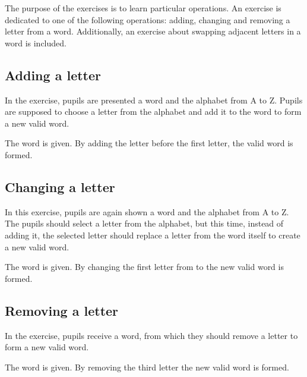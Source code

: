 The purpose of the  exercises is to learn particular operations. An exercise is dedicated to one of the following operations: adding, changing and removing a letter from a word. Additionally, an exercise about swapping adjacent letters in a word is included.

\subsection*{Adding a letter}
\label{subsection:addingLetter}

In the  exercise, pupils are presented a word and the alphabet from A to Z. Pupils are supposed to choose a letter from the alphabet and add it to the word to form a new valid word.

\begin{example}
    The word  is given. By adding the letter  before the first letter, the valid word  is formed.
\end{example}

\subsection*{Changing a letter}
\label{subsection:changingLetter}

In this exercise, pupils are again shown a word and the alphabet from A to Z. The pupils should select a letter from the alphabet, but this time, instead of adding it, the selected letter should replace a letter from the word itself to create a new valid word.

\begin{example}
    The word  is given. By changing the first letter from  to  the new valid word  is formed.
\end{example}

\subsection*{Removing a letter}
\label{subsection:removingLetters}

In the  exercise, pupils receive a word, from which they should remove a letter to form a new valid word.

\begin{example}
    The word  is given. By removing the third letter the new valid word  is formed.
\end{example}

